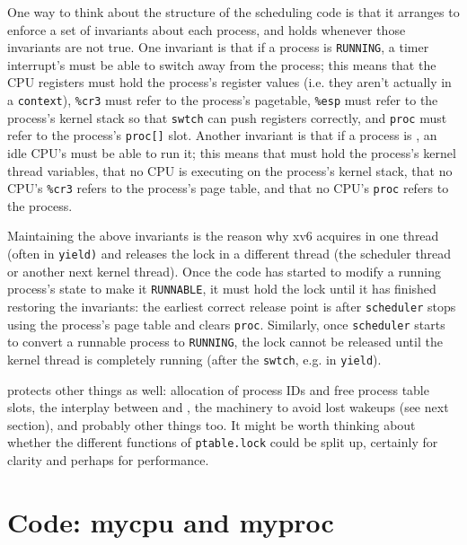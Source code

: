 One way to think about the structure of the scheduling code is
that it arranges to enforce a set of invariants about each process,
and holds
whenever those invariants are not true.
One invariant is that if a process is
\lstinline{RUNNING},
a timer interrupt's
must be able to switch away from the process;
this means that the CPU registers must hold the process's register values
(i.e. they aren't actually in a
\lstinline{context}),
\texttt{\%cr3}
must refer to the process's pagetable,
\texttt{\%esp}
must refer to the process's kernel stack so that
\lstinline{swtch}
can push registers correctly, and
\lstinline{proc}
must refer to the process's
\lstinline{proc[]}
slot.
Another invariant is that if a process is
,
an idle CPU's
must be able to run it;
this means that 
must hold the process's kernel thread variables,
that no CPU is executing on the process's kernel stack,
that no CPU's
\texttt{\%cr3}
refers to the process's page table,
and that no CPU's
\lstinline{proc}
refers to the process.

Maintaining the above invariants is the reason why xv6 acquires 
in one thread (often in
\lstinline{yield)}
and releases the lock in a different thread
(the scheduler thread or another next kernel thread).
Once the code has started to modify a running process's state
to make it
\lstinline{RUNNABLE},
it must hold the lock until it has finished restoring
the invariants: the earliest correct release point is after
\lstinline{scheduler}
stops using the process's page table and clears
\lstinline{proc}.
Similarly, once 
\lstinline{scheduler}
starts to convert a runnable process to
\lstinline{RUNNING},
the lock cannot be released until the kernel thread
is completely running (after the
\lstinline{swtch},
e.g. in
\lstinline{yield}).

protects other things as well:
allocation of process IDs and free process table slots,
the interplay between
and
,
the machinery to avoid lost wakeups (see next section),
and probably other things too.
It might be worth thinking about whether the 
different functions of
\lstinline{ptable.lock}
could be split up, certainly for clarity and perhaps
for performance.
\section{Code: mycpu and myproc}

